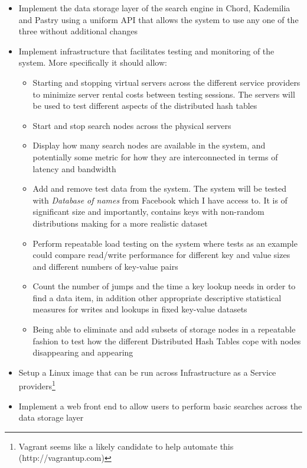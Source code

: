 \begin{itemize}
  \item Implement the data storage layer of the search engine in Chord, Kademilia and Pastry using a uniform API that allows the system to use any one of the three without additional changes
  
  \item Implement infrastructure that facilitates testing and monitoring of the system. More specifically it should allow:

  \begin{itemize}
    \item Starting and stopping virtual servers across the different service providers to minimize server rental costs between testing sessions. The servers will be used to test different aspects of the distributed hash tables
    \item Start and stop search nodes across the physical servers
    \item Display how many search nodes are available in the system, and potentially some metric for how they are interconnected in terms of latency and bandwidth
    \item Add and remove test data from the system. The system will be tested with \emph{Database of names} from Facebook which I have access to. It is of significant size and importantly, contains keys with non-random distributions making for a more realistic dataset
    \item Perform repeatable load testing on the system where tests as an example could compare read/write performance for different key and value sizes and different numbers of key-value pairs
    \item Count the number of jumps and the time a key lookup needs in order to find a data item, in addition other appropriate descriptive statistical measures for writes and lookups in fixed key-value datasets
    \item Being able to eliminate and add subsets of storage nodes in a repeatable fashion to test how the different Distributed Hash Tables cope with nodes disappearing and appearing
  \end{itemize}

  \item Setup a Linux image that can be run across Infrastructure as a Service providers\footnote{Vagrant seems like a likely candidate to help automate this (http://vagrantup.com)}

  \item Implement a web front end to allow users to perform basic searches across the data storage layer

\end{itemize}

